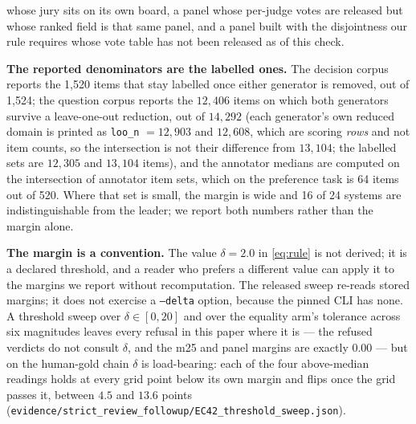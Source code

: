 \documentclass{article}
\newcommand{\ids}[1]{\texttt{\small #1}} %
\begin{document}
whose jury sits on its own board, a panel whose per-judge votes are released but whose ranked field is that same panel, and a panel built with the disjointness our rule requires whose vote table has not been released as of this check.

\textbf{The reported denominators are the labelled ones.} The decision corpus reports the 1,520 items that stay labelled once either generator is removed, out of 1,524; the question corpus reports the $12,406$ items on which both generators survive a leave-one-out reduction, out of $14,292$ (each generator's own reduced domain is printed as \texttt{loo\_n} $=12,903$ and $12,608$, which are scoring \emph{rows} and not item counts, so the intersection is not their difference from $13,104$; the labelled sets are $12,305$ and $13,104$ items), and the annotator medians are computed on the intersection of annotator item sets, which on the preference task is 64 items out of 520. Where that set is small, the margin is wide and 16 of 24 systems are indistinguishable from the leader; we report both numbers rather than the margin alone.

\textbf{The margin is a convention.} The value $\delta = 2.0$ in \eqref{eq:rule} is not derived; it is a declared threshold, and a reader who prefers a different value can apply it to the margins we report without recomputation. The released sweep re-reads stored margins; it does not exercise a \texttt{--delta} option, because the pinned CLI has none. A threshold sweep over $\delta \in [0,20]$ and over the equality arm's tolerance across six magnitudes leaves every refusal in this paper where it is --- the refused verdicts do not consult $\delta$, and the m25 and panel margins are exactly $0.00$ --- but on the human-gold chain $\delta$ is load-bearing: each of the four above-median readings holds at every grid point below its own margin and flips once the grid passes it, between $4.5$ and $13.6$ points (\ids{evidence/strict\_review\_followup/EC42\_threshold\_sweep.json}).
\end{document}
